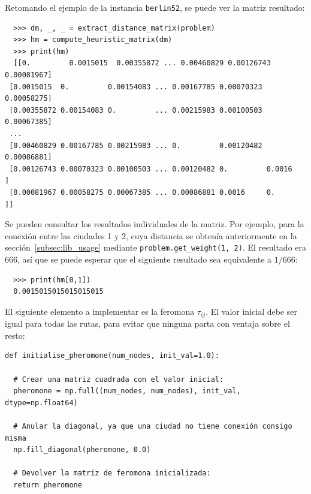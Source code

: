 Retomando el ejemplo de la instancia \texttt{berlin52}, se puede ver la matriz resultado:
\begin{verbatim}
  >>> dm, _, _ = extract_distance_matrix(problem)
  >>> hm = compute_heuristic_matrix(dm)
  >>> print(hm)
  [[0.         0.0015015  0.00355872 ... 0.00460829 0.00126743 0.00081967]
 [0.0015015  0.         0.00154083 ... 0.00167785 0.00070323 0.00058275]
 [0.00355872 0.00154083 0.         ... 0.00215983 0.00100503 0.00067385]
 ...
 [0.00460829 0.00167785 0.00215983 ... 0.         0.00120482 0.00086881]
 [0.00126743 0.00070323 0.00100503 ... 0.00120482 0.         0.0016    ]
 [0.00081967 0.00058275 0.00067385 ... 0.00086881 0.0016     0.        ]]
\end{verbatim}

Se pueden consultar los resultados individuales de la matriz. Por ejemplo, para la conexión entre las ciudades 1 y 2, cuya
distancia se obtenía anteriormente en la sección~\ref{subsec:lib_usage} mediante \texttt{problem.get\_weight(1, 2)}. El
resultado era $666$, así que se puede esperar que el siguiente resultado sea equivalente a $1/666$:

\begin{verbatim}
  >>> print(hm[0,1])
  0.0015015015015015015
\end{verbatim}

El siguiente elemento a implementar es la feromona $\tau_{ij}$. El valor inicial debe ser igual para todas las rutas, para
evitar que ninguna parta con ventaja sobre el resto:
\newline
\begin{lstlisting}[style=PythonStyle]
def initialise_pheromone(num_nodes, init_val=1.0):
 
  # Crear una matriz cuadrada con el valor inicial:
  pheromone = np.full((num_nodes, num_nodes), init_val, dtype=np.float64)
 
  # Anular la diagonal, ya que una ciudad no tiene conexión consigo misma
  np.fill_diagonal(pheromone, 0.0)
 
  # Devolver la matriz de feromona inicializada:
  return pheromone
\end{lstlisting}

